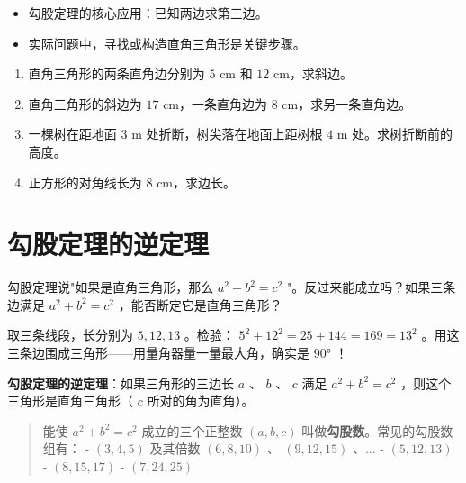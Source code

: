 \begin{keytakeaway}


\begin{itemize}
  \item 勾股定理的核心应用：已知两边求第三边。
  \item 实际问题中，寻找或构造直角三角形是关键步骤。
\end{itemize}


\end{keytakeaway}

\begin{practice}


\begin{enumerate}
  \item 直角三角形的两条直角边分别为 $5$ cm 和 $12$ cm，求斜边。
  \item 直角三角形的斜边为 $17$ cm，一条直角边为 $8$ cm，求另一条直角边。
  \item 一棵树在距地面 $3$ m 处折断，树尖落在地面上距树根 $4$ m 处。求树折断前的高度。
  \item 正方形的对角线长为 $8$ cm，求边长。
\end{enumerate}


\end{practice}



\section*{勾股定理的逆定理}


\begin{explore}


勾股定理说"如果是直角三角形，那么 $a^2 + b^2 = c^2$ "。反过来能成立吗？如果三条边满足 $a^2 + b^2 = c^2$ ，能否断定它是直角三角形？

取三条线段，长分别为 $5, 12, 13$ 。检验： $5^2 + 12^2 = 25 + 144 = 169 = 13^2$ 。用这三条边围成三角形——用量角器量一量最大角，确实是 $90°$ ！

\end{explore}

\begin{understand}


\textbf{勾股定理的逆定理}：如果三角形的三边长 $a$ 、 $b$ 、 $c$ 满足 $a^2 + b^2 = c^2$ ，则这个三角形是直角三角形（ $c$ 所对的角为直角）。

\end{understand}

\begin{quote}
能使 $a^2 + b^2 = c^2$ 成立的三个正整数 $(a, b, c)$ 叫做\textbf{勾股数}。常见的勾股数组有：
- $(3, 4, 5)$ 及其倍数 $(6, 8, 10)$ 、 $(9, 12, 15)$ 、...
- $(5, 12, 13)$
- $(8, 15, 17)$
- $(7, 24, 25)$
\end{quote}


